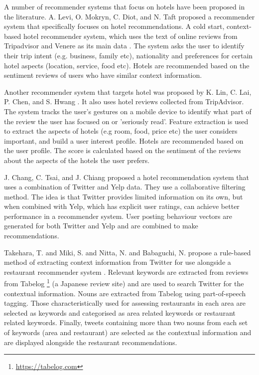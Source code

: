 A number of recommender systems that focus on hotels have been proposed in the literature. A. Levi, O. Mokryn, C. Diot, and N. Taft proposed a recommender system that specifically focuses on hotel recommendations. A cold start, context-based hotel recommender system, which uses the text of online reviews from Tripadvisor and Venere as its main data \cite{levi2012}. The system asks the user to identify their trip intent (e.g. business, family etc), nationality and preferences for certain hotel aspects (location, service, food etc). Hotels are recommended based on the sentiment reviews of users who have similar context information.

Another recommender system that targets hotel was proposed by K. Lin, C. Lai, P. Chen, and S. Hwang \cite{lin2015}. It also uses hotel reviews collected from TripAdvisor. The system tracks the user's gestures on a mobile device to identify what part of the review the user has focused on or 'seriously read'. Feature extraction is used to extract the aspects of hotels (e.g room, food, price etc) the user considers important, and build a user interest profile. Hotels are recommended based on the user profile. The score is calculated based on the sentiment of the reviews about the aspects of the hotels the user prefers.

J. Chang, C. Tsai, and J. Chiang \cite{chang2018} proposed a hotel recommendation system that uses a combination of Twitter and Yelp data. They use a collaborative filtering method. The idea is that Twitter provides limited information on its own, but when combined with Yelp, which has explicit user ratings, can achieve better performance in a recommender system. User posting behaviour vectors are generated for both Twitter and Yelp and are combined to make recommendations.

Takehara, T. and Miki, S. and Nitta, N. and Babaguchi, N. propose a rule-based method of extracting context information from Twitter for use alongside a restaurant recommender system \cite{takeharaContext2012}. Relevant keywords are extracted from reviews from Tabelog \footnote{\url{https://tabelog.com}} (a Japanese review site) and are used to search Twitter for the contextual information. Nouns are extracted from Tabelog using part-of-speech tagging. Those characteristically used for assessing restaurants in each area are selected as keywords and categorised as area related keywords or restaurant related keywords. Finally, tweets containing more than two nouns from each set of keywords (area and restaurant) are selected as the contextual information and are displayed alongside the restaurant recommendations.